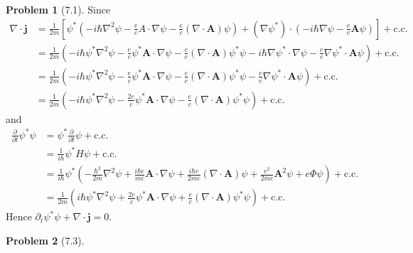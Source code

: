 \documentclass[twoside,11pt]{article}
\theoremstyle{definition}
\newtheorem{problem}{Problem}
\theoremstyle{remark}
\begin{document}
\begin{problem}[7.1]
Since
\begin{align*}
    \nabla\cdot\mathbf{j} &= \frac{1}{2m}\left[
        \psi^*(-i\hbar\nabla^2\psi-\frac{e}{c}A\cdot\nabla\psi - \frac{e}{c}(\nabla\cdot\mathbf{A})\psi)
        + (\nabla\psi^*)\cdot(-i\hbar\nabla\psi - \frac{e}{c}\mathbf{A}\psi) 
    \right]+ \mathrm{c.c.} \\ 
    &= \frac{1}{2m}\left(
    -i\hbar\psi^*\nabla^2\psi - \frac{e}{c}\psi^*\mathbf{A}\cdot\nabla\psi 
    -\frac{e}{c}(\nabla\cdot\mathbf{A})\psi^*\psi
    - i\hbar\nabla\psi^*\cdot\nabla\psi
    - \frac{e}{c}\nabla\psi^*\cdot\mathbf{A}\psi 
    \right)+ \mathrm{c.c.} \\ 
    &= \frac{1}{2m}\left(
    -i\hbar\psi^*\nabla^2\psi - \frac{e}{c}\psi^*\mathbf{A}\cdot\nabla\psi 
    -\frac{e}{c}(\nabla\cdot\mathbf{A})\psi^*\psi
    - \frac{e}{c}\nabla\psi^*\cdot\mathbf{A}\psi 
    \right)+ \mathrm{c.c.} \\ 
    &= \frac{1}{2m}\left(
    -i\hbar\psi^*\nabla^2\psi - \frac{2e}{c}\psi^*\mathbf{A}\cdot\nabla\psi 
    -\frac{e}{c}(\nabla\cdot\mathbf{A})\psi^*\psi 
    \right) + \mathrm{c.c.}
\end{align*}
and
\begin{align*}
    \frac{\partial}{\partial t}\psi^*\psi &= \psi^*\frac{\partial}{\partial t}\psi + \mathrm{c.c.}\\
    &= \frac{1}{i\hbar}\psi^* H\psi + \mathrm{c.c.}\\
    &= \frac{1}{i\hbar}\psi^*\left(
        -\frac{\hbar^2}{2m}\nabla^2\psi + \frac{i\hbar e}{mc}\mathbf{A}\cdot\nabla\psi
        + \frac{i\hbar e}{2mc}(\nabla\cdot \mathbf{A})\psi + \frac{e^2}{2mc}\mathbf{A}^2\psi
        +e\Phi\psi
    \right) + \mathrm{c.c.}\\
    &= \frac{1}{2m}\left(
        i\hbar\psi^*\nabla^2\psi + \frac{2e}{c}\psi^*\mathbf{A}\cdot\nabla\psi 
        + \frac{e}{c}(\nabla\cdot\mathbf{A})\psi^*\psi
    \right) + \mathrm{c.c.}
\end{align*}
Hence $\partial_t \psi^*\psi + \nabla\cdot\mathbf{j} = 0$.
\end{problem}




\begin{problem}[7.3]
\end{problem}







\end{document}
